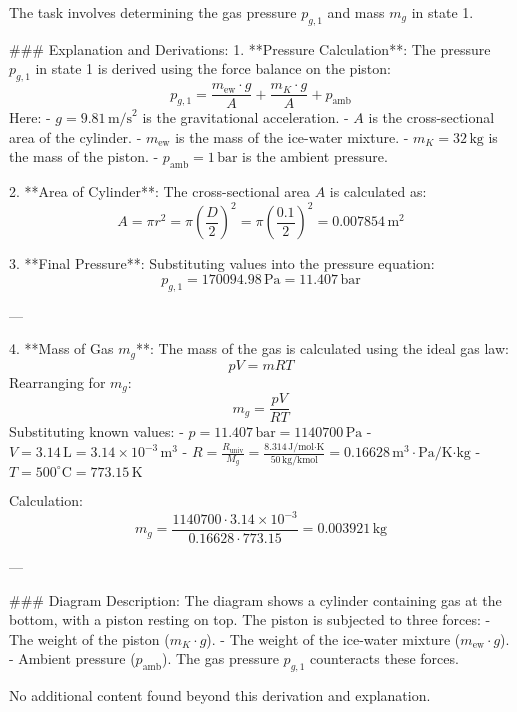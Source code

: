The task involves determining the gas pressure \( p_{g,1} \) and mass \( m_g \) in state 1.  

### Explanation and Derivations:  
1. **Pressure Calculation**:  
   The pressure \( p_{g,1} \) in state 1 is derived using the force balance on the piston:  
   \[
   p_{g,1} = \frac{m_{\text{ew}} \cdot g}{A} + \frac{m_K \cdot g}{A} + p_{\text{amb}}
   \]  
   Here:  
   - \( g = 9.81 \, \text{m/s}^2 \) is the gravitational acceleration.  
   - \( A \) is the cross-sectional area of the cylinder.  
   - \( m_{\text{ew}} \) is the mass of the ice-water mixture.  
   - \( m_K = 32 \, \text{kg} \) is the mass of the piston.  
   - \( p_{\text{amb}} = 1 \, \text{bar} \) is the ambient pressure.  

2. **Area of Cylinder**:  
   The cross-sectional area \( A \) is calculated as:  
   \[
   A = \pi r^2 = \pi \left( \frac{D}{2} \right)^2 = \pi \left( \frac{0.1}{2} \right)^2 = 0.007854 \, \text{m}^2
   \]  

3. **Final Pressure**:  
   Substituting values into the pressure equation:  
   \[
   p_{g,1} = 170094.98 \, \text{Pa} = 11.407 \, \text{bar}
   \]  

---

4. **Mass of Gas \( m_g \)**:  
   The mass of the gas is calculated using the ideal gas law:  
   \[
   pV = mRT
   \]  
   Rearranging for \( m_g \):  
   \[
   m_g = \frac{pV}{RT}
   \]  
   Substituting known values:  
   - \( p = 11.407 \, \text{bar} = 1140700 \, \text{Pa} \)  
   - \( V = 3.14 \, \text{L} = 3.14 \times 10^{-3} \, \text{m}^3 \)  
   - \( R = \frac{R_{\text{univ}}}{M_g} = \frac{8.314 \, \text{J/mol·K}}{50 \, \text{kg/kmol}} = 0.16628 \, \text{m}^3 \cdot \text{Pa}/\text{K·kg} \)  
   - \( T = 500^\circ\text{C} = 773.15 \, \text{K} \)  

   Calculation:  
   \[
   m_g = \frac{1140700 \cdot 3.14 \times 10^{-3}}{0.16628 \cdot 773.15} = 0.003921 \, \text{kg}
   \]  

---

### Diagram Description:  
The diagram shows a cylinder containing gas at the bottom, with a piston resting on top. The piston is subjected to three forces:  
- The weight of the piston (\( m_K \cdot g \)).  
- The weight of the ice-water mixture (\( m_{\text{ew}} \cdot g \)).  
- Ambient pressure (\( p_{\text{amb}} \)).  
The gas pressure \( p_{g,1} \) counteracts these forces.  

No additional content found beyond this derivation and explanation.